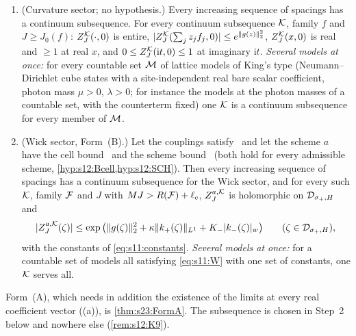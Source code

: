\begin{lemma}\label{lem:s12:LIM0}
\begin{enumerate}[label=\textup{(\alph*)},leftmargin=*,nosep]
\item \textup{(Curvature sector; no hypothesis.)} Every increasing sequence of spacings has a continuum subsequence. For every continuum subsequence $\mathcal K$, family $f$ and $J\ge J_0(f)$: $Z^{\mathcal K}_J(\cdot,0)$ is entire, $|Z^{\mathcal K}_J(\sum_jz_jf_j,0)|\le e^{\lVert g(z)\rVert_2^2}$, $Z^{\mathcal K}_J(x,0)$ is real and $\ge1$ at real $x$, and $0\le Z^{\mathcal K}_J(\mathrm it,0)\le1$ at imaginary $\mathrm it$. \emph{Several models at once:} for every countable set $\mathcal M$ of lattice models of King's type (Neumann--Dirichlet cube states with a site-independent real bare scalar coefficient, photon mass $\mu>0$, $\lambda>0$; for instance the models at the photon masses of a countable set, with the counterterm fixed) one $\mathcal K$ is a continuum subsequence for every member of $\mathcal M$.
\item \textup{(Wick sector, Form~(B).)} Let the couplings satisfy \Tthree\ and let the scheme $a$ have the cell bound \Bcell\ and the scheme bound \SCH\ (both hold for every admissible scheme, \cref{hyp:s12:Bcell,hyp:s12:SCH}). Then every increasing sequence of spacings has a continuum subsequence for the Wick sector, and for every such $\mathcal K$, family $\mathcal F$ and $J$ with $MJ>R(\mathcal F)+\ell_c$, $Z^{a,\mathcal K}_J$ is holomorphic on $\mathcal D_{\sigma_+,H}$ and
\begin{equation}\label{eq:s12:Winf}
|Z^{a,\mathcal K}_J(\zeta)|\le\exp\big(\lVert g(\zeta)\rVert_2^2+\kappa\lVert k_+(\zeta)\rVert_{L^1}+K_-\lvert k_-(\zeta)\rvert_{w}\big)\qquad(\zeta\in\mathcal D_{\sigma_+,H}),
\end{equation}
with the constants of \eqref{eq:s11:constants}. \emph{Several models at once:} for a countable set of models all satisfying \eqref{eq:s11:W} with one set of constants, one $\mathcal K$ serves all.
\end{enumerate}
\end{lemma}

Form~(A), which needs in addition the existence of the limits at every real coefficient vector (\Wtwo(a)), is \cref{thm:s23:FormA}. The subsequence is chosen in Step~2 below and nowhere else (\cref{rem:s12:K9}).

